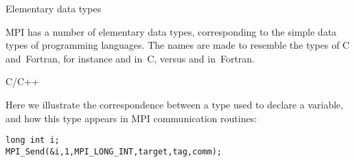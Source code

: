 
 {Elementary data types}
\label{sec:elementary}

MPI has a number of elementary data types, corresponding to the 
simple data types of programming languages.
The names are made to resemble the types of C and~Fortran, 
for instance  and  in~C,
versus
 and  in~Fortran.

\begin{comment}
  MPI calls accept arrays of elements:
  \begin{lstlisting}
    double x[20];
    MPI_Send( x,20,MPI_DOUBLE, ..... )
  \end{lstlisting}
  so for a single element you need to take its address:
  \begin{lstlisting}
    double x;
    MPI_Send( &x,1,MPI_DOUBLE, ..... )
  \end{lstlisting}
\end{comment}

 {C/C++}

Here we illustrate the correspondence between a type used to declare a variable,
and how this type appears in MPI communication routines:
\begin{lstlisting}
long int i;
MPI_Send(&i,1,MPI_LONG_INT,target,tag,comm);
\end{lstlisting}

